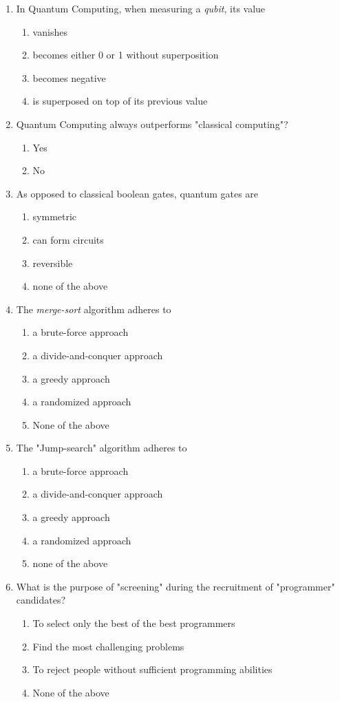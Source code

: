 \documentclass[11pt]{article}
\begin{document}
\begin{enumerate}
\item In Quantum Computing, when measuring a \emph{qubit}, its value 
\begin{enumerate}
\item vanishes
\item becomes either 0 or 1 without superposition
\item becomes negative
\item is superposed on top of its previous value
\end{enumerate}

\item Quantum Computing always outperforms "classical computing"?
\begin{enumerate}
\item Yes
\item No
\end{enumerate}

\item As opposed to classical boolean gates, quantum gates are
\begin{enumerate}
\item symmetric
\item can form circuits
\item reversible
\item none of the above
\end{enumerate}

\item The \emph{merge-sort} algorithm adheres to 
\begin{enumerate}
\item a brute-force approach
\item a divide-and-conquer approach
\item a greedy approach
\item a randomized approach
\item None of the above
\end{enumerate}

\item The "Jump-search" algorithm adheres to 
\begin{enumerate}
\item a brute-force approach
\item a divide-and-conquer approach
\item a greedy approach
\item a randomized approach
\item none of the above
\end{enumerate}

\item What is the purpose of "screening" during the recruitment of
"programmer" candidates?
\begin{enumerate}
\item To select only the best of the best programmers
\item Find the most challenging problems
\item To reject people without sufficient programming abilities
\item None of the above
\end{enumerate}
\end{enumerate}
\end{document}
